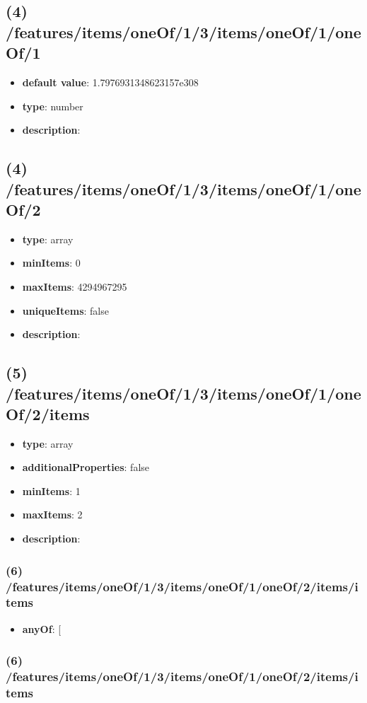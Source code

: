 \subsection{(4) /features/items/oneOf/1/3/items/oneOf/1/oneOf/1}
\begin{itemize}[leftmargin=4em]\item {\bf default value}: 1.7976931348623157e308
\item {\bf type}: number
\item {\bf description}: 
\end{itemize}\subsection{(4) /features/items/oneOf/1/3/items/oneOf/1/oneOf/2}
\begin{itemize}[leftmargin=4em]\item {\bf type}: array
\item {\bf minItems}: 0
\item {\bf maxItems}: 4294967295
\item {\bf uniqueItems}: false
\item {\bf description}: 
\end{itemize}\subsection{(5) /features/items/oneOf/1/3/items/oneOf/1/oneOf/2/items}
\begin{itemize}[leftmargin=5em]\item {\bf type}: array
\item {\bf additionalProperties}: false
\item {\bf minItems}: 1
\item {\bf maxItems}: 2
\item {\bf description}: 
\end{itemize}\subsubsection{(6) /features/items/oneOf/1/3/items/oneOf/1/oneOf/2/items/items}
\begin{itemize}[leftmargin=6em]\item {\bf anyOf}: [\end{itemize}\subsubsection{(6) /features/items/oneOf/1/3/items/oneOf/1/oneOf/2/items/items}
